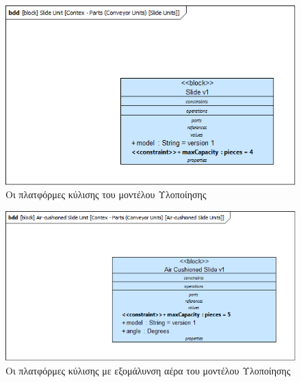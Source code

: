 \documentclass[a4paper,12pt,twoside]{report}
\begin{document}
{\begin{appendices}
				\begin{figure}[hp]
					\centering
					\includegraphics[scale=0.50]{DesignModel_Contex-Parts(ConveyorUnits)[SlideUnits].png}
					\caption{Οι πλατφόρμες κύλισης του μοντέλου Υλοποίησης}
					\label{φωτ:Οι πλατφόρμες κύλισης του μοντέλου Υλοποίησης}
				\end{figure}
				
				\begin{figure}[hp]
					\centering
					\includegraphics[scale=0.50]{DesignModel_Contex-Parts(ConveyorUnits)[Air-cushionedSlideUnits].png}
					\caption{Οι πλατφόρμες κύλισης με εξομάλυνση αέρα του μοντέλου Υλοποίησης}
					\label{φωτ:Οι πλατφόρμες κύλισης  με εξομάλυνση αέρα του μοντέλου Υλοποίησης}
				\end{figure}
				

\end{appendices}}
\end{document}

